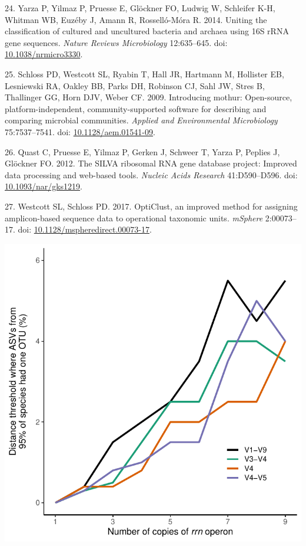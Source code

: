 \documentclass[
]{article}
\newenvironment{cslreferences}%
  {}%
  {\par}
\begin{document}
\begin{cslreferences}
\leavevmode\hypertarget{ref-Yarza2014}{}%
24. Yarza P, Yilmaz P, Pruesse E, Glöckner FO, Ludwig W, Schleifer K-H,
Whitman WB, Euzéby J, Amann R, Rosselló-Móra R. 2014. Uniting the
classification of cultured and uncultured bacteria and archaea using 16S
rRNA gene sequences. \emph{Nature Reviews Microbiology} 12:635--645.
doi: \href{https://doi.org/10.1038/nrmicro3330}{10.1038/nrmicro3330}.

\leavevmode\hypertarget{ref-Schloss2009}{}%
25. Schloss PD, Westcott SL, Ryabin T, Hall JR, Hartmann M, Hollister
EB, Lesniewski RA, Oakley BB, Parks DH, Robinson CJ, Sahl JW, Stres B,
Thallinger GG, Horn DJV, Weber CF. 2009. Introducing mothur:
Open-source, platform-independent, community-supported software for
describing and comparing microbial communities. \emph{Applied and
Environmental Microbiology} 75:7537--7541. doi:
\href{https://doi.org/10.1128/aem.01541-09}{10.1128/aem.01541-09}.

\leavevmode\hypertarget{ref-Quast2012}{}%
26. Quast C, Pruesse E, Yilmaz P, Gerken J, Schweer T, Yarza P, Peplies
J, Glöckner FO. 2012. The SILVA ribosomal RNA gene database project:
Improved data processing and web-based tools. \emph{Nucleic Acids
Research} 41:D590--D596. doi:
\href{https://doi.org/10.1093/nar/gks1219}{10.1093/nar/gks1219}.

\leavevmode\hypertarget{ref-Westcott2017}{}%
27. Westcott SL, Schloss PD. 2017. OptiClust, an improved method for
assigning amplicon-based sequence data to operational taxonomic units.
\emph{mSphere} 2:00073--17. doi:
\href{https://doi.org/10.1128/mspheredirect.00073-17}{10.1128/mspheredirect.00073-17}.
\end{cslreferences}

\setlength{\parindent}{0in}
\setlength{\leftskip}{0in}

\newpage

\includegraphics{../figures/copy_number_threshold_plot.pdf}
\end{document}

